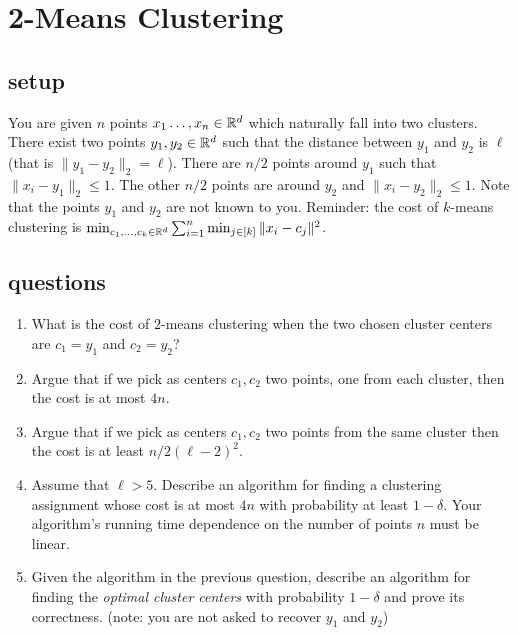 \documentclass{article}
\begin{document}

\section{2-Means Clustering}
\subsection*{setup}
You are given $n$ points $x_1\ldots,x_n \in {\mathbb{R}}^d$ which naturally fall into two clusters.
There exist two points $y_1,y_2 \in {\mathbb{R}}^d$ such that the distance between $y_1$ and $y_2$ is $\ell$ (that is $\|y_1 - y_2\|_2 = \ell$). 
There are $n/2$ points around $y_1$ such that $\|x_i - y_1\|_2 \le 1$. 
The other $n/2$ points are around $y_2$ and $\|x_i - y_2\|_2 \le 1$.
Note that the points $y_1$ and $y_2$ are not known to you.
Reminder: the cost of $k$-means clustering is $\min_{c_1,\ldots,c_k \in {\mathbb{R}}^d} \sum_{i=1}^{n}\min_{j \in [k]} \|x_i - c_j\|^2$.
\subsection*{questions}
\begin{enumerate}
\item What is the cost of $2$-means clustering when the two chosen cluster centers are $c_1 = y_1$ and $c_2=y_2$?
\item Argue that if we pick as centers $c_1,c_2$ two points, one from each cluster, then the cost is at most $4n$.
\item Argue that if we pick as centers $c_1,c_2$ two points from the same cluster then the cost is at least $n/2(\ell -2)^2$.
\item Assume that $\ell > 5$. Describe an algorithm for finding a clustering assignment whose cost is at most $4n$ with probability at least $1- \delta$.
Your algorithm's running time dependence on the number of points $n$ must be linear.
\item Given the algorithm in the previous question, describe an algorithm for finding the {\it optimal cluster centers} with probability $1-\delta$
and prove its correctness. (note: you are not asked to recover $y_1$ and $y_2$)
\end{enumerate}
\pagebreak
\end{document}
